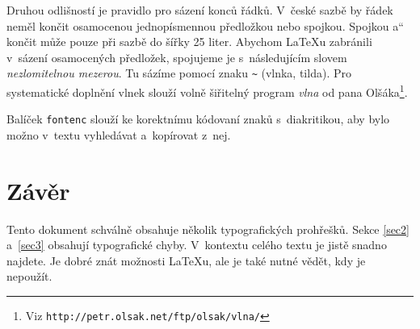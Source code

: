 \documentclass[a4paper, 10pt,twocolumn]{article}
\newcommand{\myuv}[1]{\quotedblbase #1\textquotedblleft}
\begin{document}
Druhou odlišností je pravidlo pro sázení konců řádků. V~české sazbě by řádek neměl končit osamocenou jednopísmennou předložkou nebo spojkou. Spojkou \myuv{a} končit může pouze při sazbě do šířky 25 liter. Abychom \LaTeX u zabránili v~sázení osamocených předložek, spojujeme je s~následujícím slovem \emph{nezlomitelnou mezerou}. Tu sázíme pomocí znaku \verb|~| (vlnka, tilda). Pro systematické doplnění vlnek slouží volně šiřitelný program \emph{vlna} od pana Olšáka\footnote{Viz \texttt{http://petr.olsak.net/ftp/olsak/vlna/}}.

Balíček \texttt{fontenc} slouží ke korektnímu kódovaní znaků s~diakritikou, aby bylo možno v~textu vyhledávat a~kopírovat z~nej.

\section{Závěr}

Tento dokument schválně obsahuje několik typografických prohřešků. Sekce \ref{sec2} a~\ref{sec3} obsahují typografické chyby. V~kontextu celého textu je jistě snadno najdete. Je dobré znát možnosti \LaTeX u, ale je také nutné vědět, kdy je nepoužít.
\end{document}
